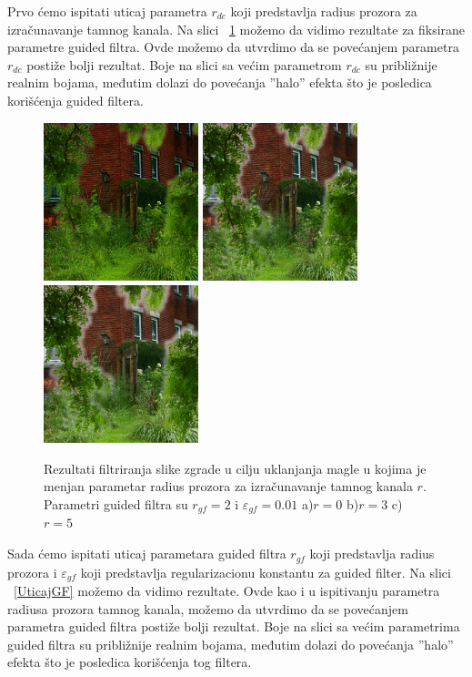 \documentclass[a4paper,12pt,titlepage]{article}
\begin{document}
Prvo ćemo ispitati uticaj parametra $r_{dc}$ koji predstavlja radius prozora za izračunavanje tamnog kanala. Na slici ~\ref{UticajRdc} možemo da vidimo rezultate za fiksirane parametre guided filtra. Ovde možemo da utvrdimo da se povećanjem parametra $r_{dc}$ postiže bolji rezultat. Boje na slici sa većim parametrom $r_{dc}$ su približnije realnim bojama, međutim dolazi do povećanja ''halo'' efekta što je posledica korišćenja guided filtera.  

\begin{figure}[ht!]
\centering
\includegraphics[width=45mm]{img/hazeResDC0.png}
\includegraphics[width=45mm]{img/hazeResDC3.png}
\includegraphics[width=45mm]{img/hazeResDC5.png}
\caption{Rezultati filtriranja slike zgrade u cilju uklanjanja magle u kojima je menjan parametar radius prozora za izračunavanje tamnog kanala $r$. Parametri guided filtra su $r_{gf} = 2$ i  $\varepsilon_{gf} = 0.01$ a)$r = 0$ b)$r = 3$ c)$r = 5$}
\label{UticajRdc}
\end{figure}  

Sada ćemo ispitati uticaj parametara guided filtra $r_{gf}$ koji predstavlja radius prozora i $\varepsilon_{gf}$ koji predstavlja  regularizacionu konstantu za guided filter. Na slici ~\ref{UticajGF} možemo da vidimo rezultate. Ovde kao i u ispitivanju parametra radiusa prozora tamnog kanala, možemo da utvrdimo da se povećanjem parametra guided filtra postiže bolji rezultat. Boje na slici sa većim parametrima guided filtra su približnije realnim bojama, međutim dolazi do povećanja ''halo'' efekta što je posledica korišćenja tog filtera. 
\end{document}
